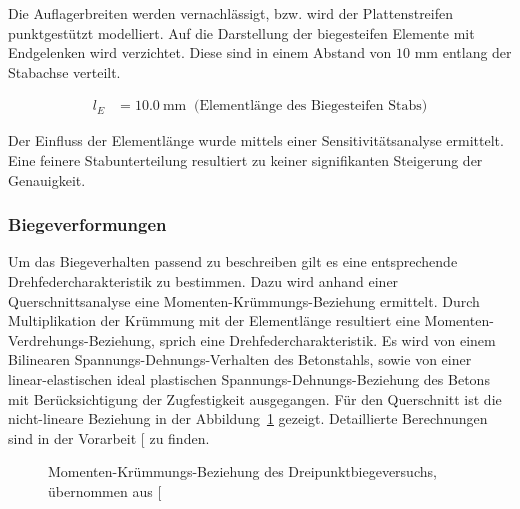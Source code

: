 \documentclass[
  11pt,
  letterpaper,
]{scrreprt}
\begin{document}
Die Auflagerbreiten werden vernachlässigt, bzw. wird der Plattenstreifen
punktgestützt modelliert. Auf die Darstellung der biegesteifen Elemente
mit Endgelenken wird verzichtet. Diese sind in einem Abstand von \(10\)
mm entlang der Stabachse verteilt.

$$
\begin{aligned}
l_{E} &= 10.0\ \mathrm{mm} \; \;\textrm{(Elementlänge des Biegesteifen Stabs)}
\end{aligned}
$$

Der Einfluss der Elementlänge wurde mittels einer Sensitivitätsanalyse
ermittelt. Eine feinere Stabunterteilung resultiert zu keiner
signifikanten Steigerung der Genauigkeit.

\subsubsection{Biegeverformungen}\label{biegeverformungen}

Um das Biegeverhalten passend zu beschreiben gilt es eine entsprechende
Drehfedercharakteristik zu bestimmen. Dazu wird anhand einer
Querschnittsanalyse eine Momenten-Krümmungs-Beziehung ermittelt. Durch
Multiplikation der Krümmung mit der Elementlänge resultiert eine
Momenten-Verdrehungs-Beziehung, sprich eine Drehfedercharakteristik. Es
wird von einem Bilinearen Spannungs-Dehnungs-Verhalten des Betonstahls,
sowie von einer linear-elastischen ideal plastischen
Spannungs-Dehnungs-Beziehung des Betons mit Berücksichtigung der
Zugfestigkeit ausgegangen. Für den Querschnitt ist die nicht-lineare
Beziehung in der Abbildung~\ref{fig-mchi_a3v2} gezeigt. Detaillierte
Berechnungen sind in der Vorarbeit
{[}\citeproc{ref-gitz_ansatze_2024}{1}{]} zu finden.

\begin{figure}[H]


\caption{\label{fig-mchi_a3v2}Momenten-Krümmungs-Beziehung des
Dreipunktbiegeversuchs, übernommen aus
{[}\citeproc{ref-gitz_ansatze_2024}{1}{]}}

\end{figure}%
\end{document}
